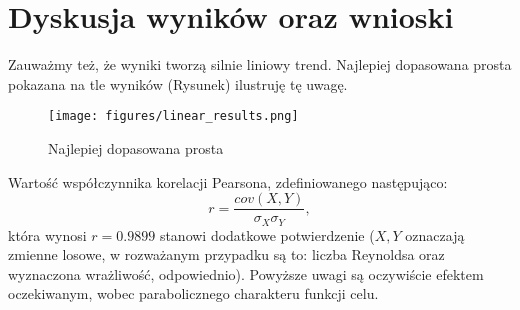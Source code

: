 \documentclass[12pt]{article}
\begin{document}
\section{Dyskusja wyników oraz wnioski}
Zauważmy też, że wyniki tworzą silnie liniowy trend. Najlepiej dopasowana prosta pokazana na tle wyników (Rysunek) ilustruję tę uwagę.
\begin{figure}[H]
	\texttt{[image: figures/linear\_results.png]} 
	\centering
	\caption{Najlepiej dopasowana prosta}
\end{figure}
Wartość współczynnika korelacji Pearsona, zdefiniowanego następująco:
\begin{equation}
r = \frac{cov(X,Y)}{\sigma_{X}\sigma_{Y}},
\end{equation}
która wynosi $ r = 0.9899 $ stanowi dodatkowe potwierdzenie ($ X, Y $ oznaczają zmienne losowe, w rozważanym przypadku są to: liczba Reynoldsa oraz wyznaczona wrażliwość, odpowiednio).\newline
Powyższe uwagi są oczywiście efektem oczekiwanym, wobec parabolicznego charakteru funkcji celu.\newline
\newpage
\end{document}
